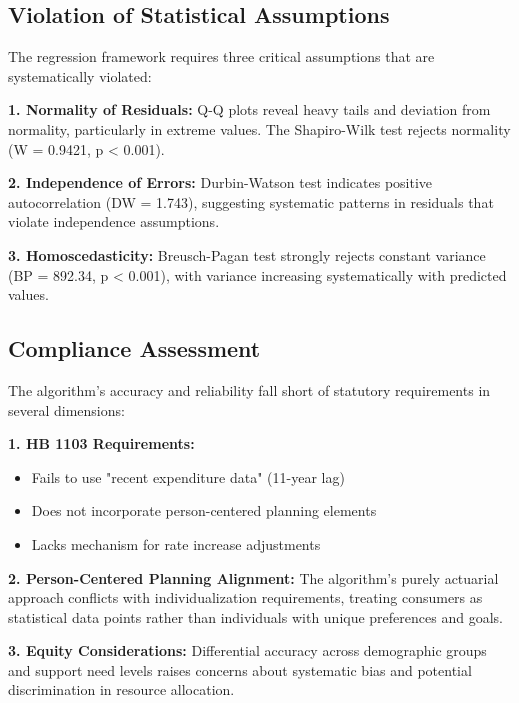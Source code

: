 \subsection{Violation of Statistical Assumptions}

The regression framework requires three critical assumptions that are systematically violated:

\textbf{1. Normality of Residuals:}
Q-Q plots reveal heavy tails and deviation from normality, particularly in extreme values. The Shapiro-Wilk test rejects normality (W = 0.9421, p < 0.001).

\textbf{2. Independence of Errors:}
Durbin-Watson test indicates positive autocorrelation (DW = 1.743), suggesting systematic patterns in residuals that violate independence assumptions.

\textbf{3. Homoscedasticity:}
Breusch-Pagan test strongly rejects constant variance (BP = 892.34, p < 0.001), with variance increasing systematically with predicted values.

\subsection{Compliance Assessment}

The algorithm's accuracy and reliability fall short of statutory requirements in several dimensions:

\textbf{1. HB 1103 Requirements:}
\begin{itemize}
    \item Fails to use "recent expenditure data" (11-year lag)
    \item Does not incorporate person-centered planning elements
    \item Lacks mechanism for rate increase adjustments
\end{itemize}

\textbf{2. Person-Centered Planning Alignment:}
The algorithm's purely actuarial approach conflicts with individualization requirements, treating consumers as statistical data points rather than individuals with unique preferences and goals.

\textbf{3. Equity Considerations:}
Differential accuracy across demographic groups and support need levels raises concerns about systematic bias and potential discrimination in resource allocation.

